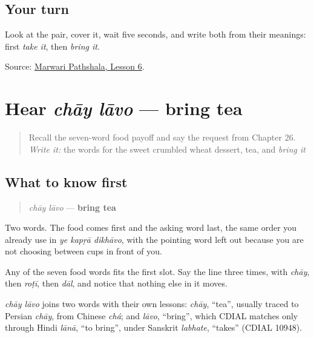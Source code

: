 \subsection*{Your turn}
Look at the pair, cover it, wait five seconds, and write both from their meanings: first \emph{take it}, then \emph{bring it}.

\begin{tcolorbox}[breakable,colback=teal!4,colframe=teal!35!black,title={Before you move on}]
Source: \href{https://www.marwaripathshala.com/marwari-lesson-6-english}{Marwari Pathshala, Lesson 6}.
\end{tcolorbox}
\section[chāy lāvo]{Hear \emph{chāy lāvo} — bring tea}

\label{lesson:MW-C25-hear-bring-request}



\begin{quote}
Recall the seven-word food payoff and say the request from Chapter 26. \emph{Write it:} the words for the sweet crumbled wheat dessert, tea, and \emph{bring it}
\end{quote}

\subsection*{What to know first}
\begin{quote}
\emph{chāy lāvo} — \textbf{bring tea}
\end{quote}

Two words. The food comes first and the asking word last, the same order you already use in \emph{ye kapṛā dikhāvo}, with the pointing word left out because you are not choosing between cups in front of you.

Any of the seven food words fits the first slot. Say the line three times, with \emph{chāy}, then \emph{roṭī}, then \emph{dāl}, and notice that nothing else in it moves.

\begin{cousinweb}
\emph{chāy lāvo} joins two words with their own lessons: \emph{chāy}, \textquotedblleft{}tea\textquotedblright{}, usually traced to Persian \emph{chāy}, from Chinese \emph{chá}; and \emph{lāvo}, \textquotedblleft{}bring\textquotedblright{}, which CDIAL matches only through Hindi \emph{lānā}, \textquotedblleft{}to bring\textquotedblright{}, under Sanskrit \emph{labhate}, \textquotedblleft{}takes\textquotedblright{} (CDIAL 10948).
\end{cousinweb}

